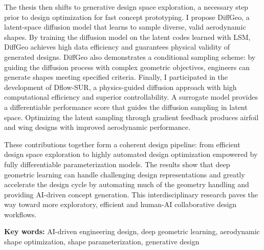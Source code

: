 The thesis then shifts to generative design space exploration, a necessary step prior to design optimization for fast concept prototyping. I propose DiffGeo, a latent-space diffusion model that learns to sample diverse, valid aerodynamic shapes. By training the diffusion model on the latent codes learned with LSM, DiffGeo achieves high data efficiency and guarantees physical validity of generated designs. DiffGeo also demonstrates a conditional sampling scheme: by guiding the diffusion process with complex geometric objectives, engineers can generate shapes meeting specified criteria. Finally, I participated in the development of Dflow-SUR, a physics-guided diffusion approach with high computational efficiency and superior controllability. A surrogate model provides a differentiable performance score that guides the diffusion sampling in latent space. Optimizing the latent sampling through gradient feedback produces airfoil and wing designs with improved aerodynamic performance.

These contributions together form a coherent design pipeline: from efficient design space exploration to highly automated design optimization empowered by fully differentiable parameterization models. The results show that deep geometric learning can handle challenging design representations and greatly accelerate the design cycle by automating much of the geometry handling and providing AI-driven concept generation. This interdisciplinary research paves the way toward more exploratory, efficient and human-AI collaborative design workflows.

\textbf{Key words:} AI-driven engineering design, deep geometric learning, aerodynamic shape optimization, shape parameterization, generative design

